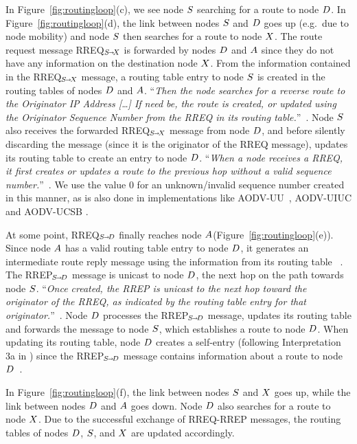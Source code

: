 \documentclass[letterpaper]{sig-alternate-pages}
\renewcommand{\msg}[3]{#1${}_{\!\!\;\MakeUppercase{#2}\!\!\:\shortrightarrow\!\MakeUppercase{#3}}$\xspace}
\newcommand{\gennode}[1]{\ensuremath{\MakeUppercase{#1}}\xspace}
\newcommand{\na}{\gennode{a}}
\newcommand{\nd}{\gennode{d}}
\newcommand{\ns}{\gennode{s}}
\newcommand{\nx}{\gennode{x}}
\newcommand{\rte}{routing table entry\xspace}
\renewcommand{\sf}{\it}
\begin{document}
In Figure~\ref{fig:routingloop}(c), we see node \ns searching for a route to node \nd. In Figure~\ref{fig:routingloop}(d), the link between nodes \ns and \nd goes up (e.g.\ due to node mobility) and node \ns then searches for a route to node \nx. The route request message \msg{RREQ}{s}{x} is forwarded by nodes \nd and \na since they do not have any information on the destination node \nx. From the information contained in the \msg{RREQ}{s}{x} message, a \rte to node \ns is created in the routing tables of nodes \nd and \na. 
``{\sf Then the node searches for a reverse route to the Originator IP Address {[\dots]}  If need be, the route is created, or updated using the Originator Sequence Number from the RREQ in its routing table.\/}''~\cite[Sect. 6.5]{rfc3561}. 
Node \ns also receives the forwarded \msg{RREQ}{s}{x} message from node \nd, and before silently discarding the message (since it is the originator of the RREQ message), updates its routing table to create an entry to node \nd.
``{\sf When a node receives a RREQ, it first creates or updates a route to the previous hop without a valid sequence number.\/}''~\cite[Sect. 6.5]{rfc3561}. We use the value $0$ for an unknown/invalid sequence number created in this manner, as is also done in implementations like AODV-UU~\cite{AODVUU}, AODV-UIUC \cite{Kawadia03} and AODV-UCSB \cite{CB04}.

At some point, \msg{RREQ}{s}{d} finally reaches node \na (Figure~\ref{fig:routingloop}(e)). Since node \na has a valid \rte to node \nd, it generates an intermediate route reply message using the information from its routing table ~\cite[Sect. 6.6 and 6.6.2]{rfc3561}. 
The \msg{RREP}{s}{d} message is unicast to node \nd, the next hop on the path towards node \ns. ``{\sf Once created, the RREP is unicast to the next hop toward the originator of the RREQ, as indicated by the \rte for that originator.\/}''~\cite[Sect. 6.6]{rfc3561}. Node \nd processes the \msg{RREP}{s}{d} message, updates its routing table and 
forwards the message to node \ns, which establishes a route to node \nd. When updating its routing table, node \nd creates a self-entry (following Interpretation 3a in ) since the \msg{RREP}{s}{d} message contains information about a route to node \nd ~\cite[Sect. 6.7]{rfc3561}. 

In Figure~\ref{fig:routingloop}(f), the link between nodes \ns and \nx goes up, while the link between nodes \nd and \na goes down. Node \nd also searches for a route to node \nx. Due to the successful exchange of RREQ-RREP messages, the routing tables of nodes \nd, \ns, and \nx are updated accordingly.
\end{document}
